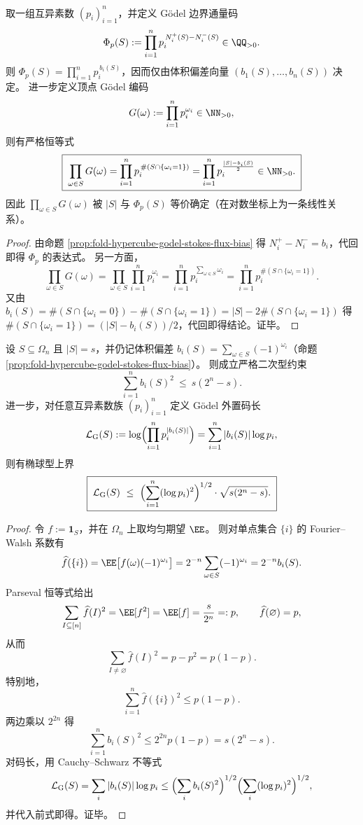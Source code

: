 \begin{proposition}\label{prop:fold-hypercube-godel-flux-multiplicative-volume}
取一组互异素数 \((p_i)_{i=1}^n\)，并定义 Gödel 边界通量码
\[
\Phi_p(S):=\prod_{i=1}^n p_i^{\,N_i^+(S)-N_i^-(S)}\in\QQ_{>0}.
\]
则 \(\Phi_p(S)=\prod_{i=1}^n p_i^{\,b_i(S)}\)，因而仅由体积偏差向量 \((b_1(S),\dots,b_n(S))\) 决定。
进一步定义顶点 Gödel 编码
\[
G(\omega):=\prod_{i=1}^n p_i^{\omega_i}\in\NN_{>0},
\]
则有严格恒等式
\[
\boxed{\;
\prod_{\omega\in S}G(\omega)
=\prod_{i=1}^n p_i^{\,\#(S\cap\{\omega_i=1\})}
=\prod_{i=1}^n p_i^{\frac{|S|-b_i(S)}{2}}\in\NN_{>0}.
\;}
\]
因此 \(\prod_{\omega\in S}G(\omega)\) 被 \(|S|\) 与 \(\Phi_p(S)\) 等价确定（在对数坐标上为一条线性关系）。
\end{proposition}
\begin{proof}
由命题 \ref{prop:fold-hypercube-godel-stokes-flux-bias} 得 \(N_i^+-N_i^-=b_i\)，代回即得 \(\Phi_p\) 的表达式。
另一方面，
\[
\prod_{\omega\in S}G(\omega)
=\prod_{\omega\in S}\prod_{i=1}^n p_i^{\omega_i}
=\prod_{i=1}^n p_i^{\sum_{\omega\in S}\omega_i}
=\prod_{i=1}^n p_i^{\#(S\cap\{\omega_i=1\})}.
\]
又由
\(
b_i(S)=\#(S\cap\{\omega_i=0\})-\#(S\cap\{\omega_i=1\})=|S|-2\#(S\cap\{\omega_i=1\})
\)
得 \(\#(S\cap\{\omega_i=1\})=(|S|-b_i(S))/2\)，代回即得结论。证毕。
\end{proof}

\begin{proposition}\label{prop:fold-hypercube-bias-ellipsoid-godel-length}
设 \(S\subseteq\Omega_n\) 且 \(|S|=s\)，并仍记体积偏差 \(b_i(S)=\sum_{\omega\in S}(-1)^{\omega_i}\)（命题 \ref{prop:fold-hypercube-godel-stokes-flux-bias}）。
则成立严格二次型约束
\[
\boxed{\;\sum_{i=1}^n b_i(S)^2\ \le\ s(2^n-s).\;}
\]
进一步，对任意互异素数族 \((p_i)_{i=1}^n\) 定义 Gödel 外置码长
\[
\mathcal{L}_{\mathrm G}(S)
:=\log\Bigl(\prod_{i=1}^n p_i^{|b_i(S)|}\Bigr)
=\sum_{i=1}^n |b_i(S)|\log p_i,
\]
则有椭球型上界
\[
\boxed{\;\mathcal{L}_{\mathrm G}(S)\ \le\
\Bigl(\sum_{i=1}^n(\log p_i)^2\Bigr)^{1/2}\cdot \sqrt{s(2^n-s)}.\;}
\]
\end{proposition}
\begin{proof}
令 \(f:=\mathbf 1_S\)，并在 \(\Omega_n\) 上取均匀期望 \(\EE\)。
则对单点集合 \(\{i\}\) 的 Fourier--Walsh 系数有
\[
\widehat f(\{i\})
=\EE\bigl[f(\omega)(-1)^{\omega_i}\bigr]
=2^{-n}\sum_{\omega\in S}(-1)^{\omega_i}
=2^{-n}b_i(S).
\]
Parseval 恒等式给出
\[
\sum_{I\subseteq[n]}\widehat f(I)^2=\EE[f^2]=\EE[f]=\frac{s}{2^n}=:p,
\qquad
\widehat f(\varnothing)=p,
\]
从而
\[
\sum_{I\neq\varnothing}\widehat f(I)^2=p-p^2=p(1-p).
\]
特别地，
\[
\sum_{i=1}^n \widehat f(\{i\})^2\le p(1-p).
\]
两边乘以 \(2^{2n}\) 得
\[
\sum_{i=1}^n b_i(S)^2\le 2^{2n}p(1-p)=s(2^n-s).
\]
对码长，用 Cauchy--Schwarz 不等式
\[
\mathcal{L}_{\mathrm G}(S)
=\sum_i |b_i(S)|\log p_i
\le
\Bigl(\sum_i b_i(S)^2\Bigr)^{1/2}\Bigl(\sum_i(\log p_i)^2\Bigr)^{1/2},
\]
并代入前式即得。证毕。
\end{proof}

